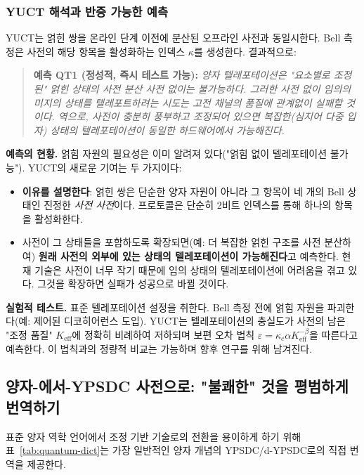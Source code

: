 \documentclass[12pt,a4paper]{article}
\begin{document}
	\subsubsection{YUCT 해석과 반증 가능한 예측}
	
	YUCT는 얽힌 쌍을 온라인 단계 이전에 분산된 오프라인 사전과 동일시한다. Bell 측정은 사전의 해당 항목을 활성화하는 인덱스 $\kappa$를 생성한다. 결과적으로:
	
	\begin{quote}
		\textbf{예측 QT1 (정성적, 즉시 테스트 가능):}
		\emph{양자 텔레포테이션은 "요소별로 조정된" 얽힌 상태의 사전 분산 사전 없이는 불가능하다. 그러한 사전 없이 임의의 미지의 상태를 텔레포트하려는 시도는 고전 채널의 품질에 관계없이 실패할 것이다. 역으로, 사전이 충분히 풍부하고 조정되어 있으면 복잡한(심지어 다중 입자) 상태의 텔레포테이션이 동일한 하드웨어에서 가능해진다.}
	\end{quote}
	
	\textbf{예측의 현황.}
	얽힘 자원의 필요성은 이미 알려져 있다("얽힘 없이 텔레포테이션 불가능"). YUCT의 새로운 기여는 두 가지이다:
	
	\begin{itemize}
		\item \textbf{이유를 설명한다}: 얽힌 쌍은 단순한 양자 자원이 아니라 그 항목이 네 개의 Bell 상태인 진정한 \emph{사전 사전}이다. 프로토콜은 단순히 2비트 인덱스를 통해 하나의 항목을 활성화한다.
		\item 사전이 그 상태들을 포함하도록 확장되면(예: 더 복잡한 얽힌 구조를 사전 분산하여) \textbf{원래 사전의 외부에 있는 상태의 텔레포테이션이 가능해진다}고 예측한다. 현재 기술은 사전이 너무 작기 때문에 임의 상태의 텔레포테이션에 어려움을 겪고 있다. 그것을 확장하면 실패가 성공으로 바뀔 것이다.
	\end{itemize}
	
	\textbf{실험적 테스트.}
	표준 텔레포테이션 설정을 취한다. Bell 측정 전에 얽힘 자원을 파괴한다(예: 제어된 디코히어런스 도입). YUCT는 텔레포테이션의 충실도가 사전의 남은 "조정 품질" $K_{\mathrm{eff}}$에 정확히 비례하여 저하되며 보편 오차 법칙 $\varepsilon = \kappa_c \alpha K_{\mathrm{eff}}^{-\beta}$을 따른다고 예측한다. 이 법칙과의 정량적 비교는 가능하며 향후 연구를 위해 남겨진다.
	
	\subsection{양자-에서-YPSDC 사전으로: "불쾌한" 것을 평범하게 번역하기}
	
	표준 양자 역학 언어에서 조정 기반 기술로의 전환을 용이하게 하기 위해 표~\ref{tab:quantum-dict}는 가장 일반적인 양자 개념의 YPSDC/d-YPSDC로의 직접 번역을 제공한다.
	
\end{document}
